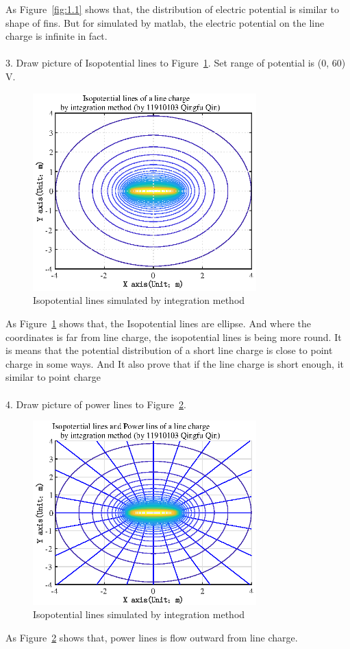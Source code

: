 \documentclass[10pt, journal, final]{IEEEtran}
\begin{document}
As Figure~\ref{fig:1.1} shows that,
the distribution of electric potential is similar to shape of fins.
But for simulated by matlab,
the electric potential on the line charge is infinite in fact.\\
\\
3. Draw picture of Isopotential lines to Figure~\ref{fig:1.2}.
Set range of potential is (0, 60) V.

\label{work1.3}
\begin{figure}[htbp]
    \centering
    \includegraphics[width = 3.4in]{figures-2/fig1.2.eps}
    \caption{Isopotential lines simulated by integration method}
    \label{fig:1.2}
\end{figure}
As Figure~\ref{fig:1.2} shows that, the Isopotential lines are ellipse.
And where the coordinates is far from line charge, the isopotential lines is being more round.
It is means that the potential distribution of a short line charge
is close to point charge in some ways.
And It also prove that if the line charge is short enough, it similar to point charge\\
\\
4. Draw picture of power lines to Figure~\ref{fig:1.3}.

\label{work1.4}
\begin{figure}[htbp]
    \centering
    \includegraphics[width = 3.4in]{figures-2/fig1.3.eps}
    \caption{Isopotential lines simulated by integration method}
    \label{fig:1.3}
\end{figure}
As Figure~\ref{fig:1.3} shows that, power lines is flow outward from line charge.
\end{document}
